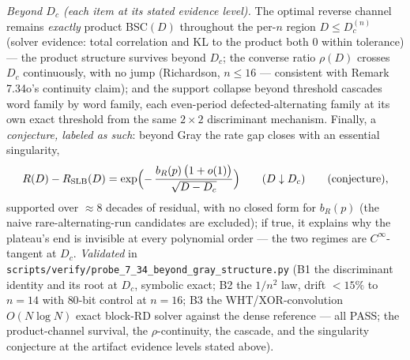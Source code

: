 \documentclass[
]{article}
\begin{document}
\emph{Beyond $D_c$ (each item at its stated evidence level).} The optimal
reverse channel remains \emph{exactly} product BSC$(D)$ throughout the
per-$n$ region $D\le D_c^{(n)}$ (solver evidence: total correlation and KL to
the product both $0$ within tolerance) --- the product structure survives
beyond $D_c$; the converse ratio $\rho(D)$ crosses $D_c$ continuously, with no
jump (Richardson, $n\le16$ --- consistent with Remark 7.34o's continuity
claim); and the support collapse beyond threshold cascades word family by word
family, each even-period defected-alternating family at its own exact
threshold from the same $2\times2$ discriminant mechanism. Finally, a
\emph{conjecture, labeled as such}: beyond Gray the rate gap closes with an
essential singularity,
\[
  R(D)-R_{\mathrm{SLB}}(D)
  =\exp\Bigl(-\,\frac{b_R(p)\,\bigl(1+o(1)\bigr)}{\sqrt{D-D_c}}\Bigr)
  \qquad(D\downarrow D_c)\qquad\text{(conjecture)},
\]
supported over $\approx8$ decades of residual, with no closed form for
$b_R(p)$ (the naive rare-alternating-run candidates are excluded); if true, it
explains why the plateau's end is invisible at every polynomial order --- the
two regimes are $C^\infty$-tangent at $D_c$. \emph{Validated} in
\texttt{scripts/verify/probe\_7\_34\_beyond\_gray\_structure.py} (B1 the
discriminant identity and its root at $D_c$, symbolic exact; B2 the $1/n^2$
law, drift $<15\%$ to $n=14$ with $80$-bit control at $n=16$; B3 the
WHT/XOR-convolution $O(N\log N)$ exact block-RD solver against the dense
reference --- all PASS; the product-channel survival, the $\rho$-continuity,
the cascade, and the singularity conjecture at the artifact evidence levels
stated above).
\end{document}
